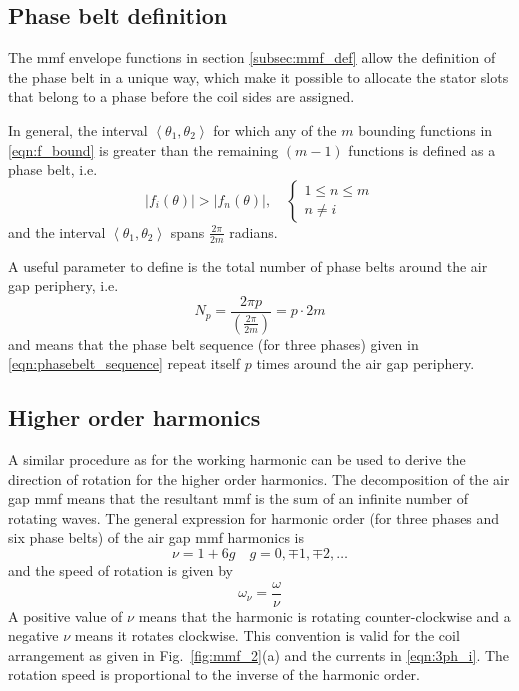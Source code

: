 \subsection{Phase belt definition}\label{subsec:phasebelt_def}
The mmf envelope functions in section \ref{subsec:mmf_def} allow the definition of the phase belt in a unique way, which make it possible to allocate the stator slots that belong to a phase before the coil sides are assigned. 
\begin{defth}
In general, the interval $\left\langle \theta_1,\theta_2 \right\rangle$ for which any of the $m$ bounding functions in \eqref{eqn:f_bound} is greater than the remaining $(m-1)$ functions is defined as a phase belt, i.e. 
\begin{equation}
 \left|f_i(\theta)\right| > \left|f_n(\theta)\right|, \quad
 \begin{cases}
   1 \leq n \leq m \\
   n \neq i
 \end{cases}
\end{equation}
and the interval $\left\langle \theta_1,\theta_2 \right\rangle$ spans $\frac{2\pi}{2m}$ radians. 
\end{defth}
A useful parameter to define is the total number of phase belts around the air gap periphery, i.e. 
\begin{equation}
  \label{eqn:Np}
  N_p = \frac{2\pi p}{\left(\frac{2\pi}{2m}\right)}=p\cdot2m
\end{equation}
and means that the phase belt sequence (for three phases) given in \eqref{eqn:phasebelt_sequence} repeat itself $p$ times around the air gap periphery.

\subsection{Higher order harmonics}
A similar procedure as for the working harmonic can be used to derive the direction of rotation for the higher order harmonics. The decomposition of the air gap mmf means that the resultant mmf is the sum of an infinite number of rotating waves. The general expression for harmonic order (for three phases and six phase belts) of the air gap mmf harmonics is
\begin{equation}
  \label{eqn:harm_oder}
  \nu = 1+6g \quad g=0,\mp1,\mp2,\ldots
\end{equation}
and the speed of rotation is given by 
\begin{equation}
  \omega_{\nu} = \frac{\omega}{\nu}
\end{equation}
A positive value of $\nu$ means that the harmonic is rotating counter-clockwise and a negative $\nu$ means it rotates clockwise. This convention is valid for the coil arrangement as given in Fig.~\ref{fig:mmf_2}(a) and the currents in \eqref{eqn:3ph_i}. The rotation speed is proportional to the inverse of the harmonic order.